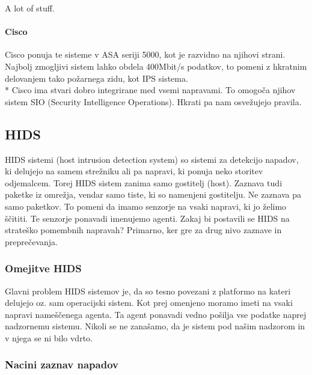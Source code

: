 \documentclass[12pt]{article}
\begin{document}
A lot of stuff.


\paragraph{Cisco} %
\label{par:Cisco}

Cisco ponuja te sisteme v ASA seriji 5000\cite{cisco5000}, kot je razvidno na njihovi strani.
Najbolj zmogljivi sistem lahko obdela 400Mbit/s podatkov, to pomeni z hkratnim delovanjem tako požarnega zidu, kot IPS sistema. 
\\*
Cisco ima stvari dobro integrirane med vsemi napravami. To omogoča njihov sistem SIO (Security Intelligence Operations). Hkrati pa nam osvežujejo pravila.





\subsection{HIDS}

HIDS sistemi (host intrusion detection system) so sistemi za detekcijo napadov, ki delujejo na samem strežniku ali pa napravi,
ki ponuja neko storitev odjemalcem.
Torej HIDS sistem zanima samo gostitelj (host).
Zaznava tudi paketke iz omrežja, vendar samo tiste, ki so namenjeni gostitelju.
Ne zaznava pa samo paketkov.
To pomeni da imamo senzorje na vsaki napravi, ki jo želimo ščititi.
Te senzorje ponavadi imenujemo agenti.
Zakaj bi postavili se HIDS na strateško pomembnih napravah?
Primarno, ker gre za drug nivo zaznave in preprečevanja. 

\subsubsection{Omejitve HIDS} %

Glavni problem HIDS sistemov je, da so tesno povezani z platformo na kateri delujejo 
oz. sam operacijski sistem.
Kot prej omenjeno moramo imeti na vsaki napravi nameščenega agenta. Ta agent ponavadi vedno pošilja vse podatke naprej nadzornemu sistemu.
Nikoli se ne zanašamo, da je sistem pod našim nadzorom in v njega se ni bilo vdrto.


\subsubsection{Nacini zaznav napadov} %
\end{document}
